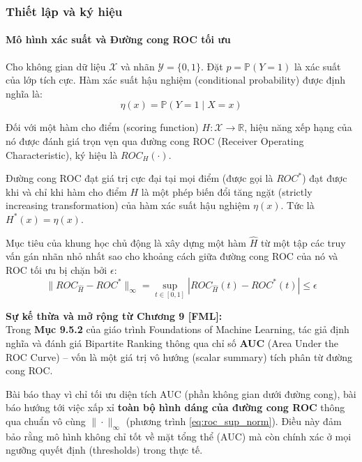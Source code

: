\subsubsection{Thiết lập và ký hiệu}
\paragraph{Mô hình xác suất và Đường cong ROC tối ưu}
Cho không gian dữ liệu $\mathcal{X}$ và nhãn $\mathcal{Y} = \{0, 1\}$. Đặt $p = \mathbb{P}(Y=1)$ là xác suất của lớp tích cực. Hàm xác suất hậu nghiệm (conditional probability) được định nghĩa là:
\begin{equation}
  \eta(x) = \mathbb{P}(Y=1 \mid X=x)
\end{equation}

Đối với một hàm cho điểm (scoring function) $H: \mathcal{X} \to \mathbb{R}$, hiệu năng xếp hạng của nó được đánh giá trọn vẹn qua đường cong ROC (Receiver Operating Characteristic), ký hiệu là $ROC_H(\cdot)$. 

\begin{dinh_nghia}
  \label{optimal_roc}
  Đường cong ROC đạt giá trị cực đại tại mọi điểm (được gọi là $ROC^*$) đạt được khi và chỉ khi hàm cho điểm $H$ là một phép biến đổi tăng ngặt (strictly increasing transformation) của hàm xác suất hậu nghiệm $\eta(x)$. Tức là $H^*(x) = \eta(x)$.
\end{dinh_nghia}

Mục tiêu của khung học chủ động là xây dựng một hàm $\hat{H}$ từ một tập các truy vấn gán nhãn nhỏ nhất sao cho khoảng cách giữa đường cong ROC của nó và ROC tối ưu bị chặn bởi $\epsilon$:
\begin{equation}
  \| ROC_{\hat{H}} - ROC^* \|_{\infty} = \sup_{t \in [0,1]} | ROC_{\hat{H}}(t) - ROC^*(t) | \le \epsilon
  \label{eq:roc_sup_norm}
\end{equation}

\begin{lienhe_ly_thuyet}
  \textbf{Sự kế thừa và mở rộng từ Chương 9 [FML]:} \\
  Trong \textbf{Mục 9.5.2} của giáo trình Foundations of Machine Learning, tác giả định nghĩa và đánh giá Bipartite Ranking thông qua chỉ số \textbf{AUC} (Area Under the ROC Curve) -- vốn là một giá trị vô hướng (scalar summary) tích phân từ đường cong ROC.
  
  Bài báo thay vì chỉ tối ưu diện tích AUC (phần không gian dưới đường cong), bài báo hướng tới việc xấp xỉ \textbf{toàn bộ hình dáng của đường cong ROC} thông qua chuẩn vô cùng $\| \cdot \|_{\infty}$ (phương trình \ref{eq:roc_sup_norm}). Điều này đảm bảo rằng mô hình không chỉ tốt về mặt tổng thể (AUC) mà còn chính xác ở mọi ngưỡng quyết định (thresholds) trong thực tế.
\end{lienhe_ly_thuyet}

